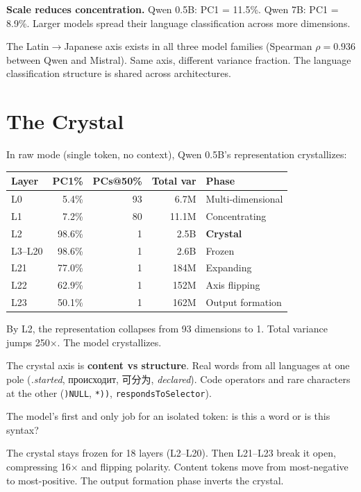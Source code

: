 \documentclass[11pt,a4paper]{report}
\begin{document}
\textbf{Scale reduces concentration.} Qwen 0.5B: PC1 = 11.5\%. Qwen 7B: PC1 = 8.9\%. Larger models spread their language classification across more dimensions.

The Latin$\to$Japanese axis exists in all three model families (Spearman $\rho = 0.936$ between Qwen and Mistral). Same axis, different variance fraction. The language classification structure is shared across architectures.

\section{The Crystal}

In raw mode (single token, no context), Qwen 0.5B's representation crystallizes:

\begin{center}
\begin{tabular}{lrrrl}
\toprule
\textbf{Layer} & \textbf{PC1\%} & \textbf{PCs@50\%} & \textbf{Total var} & \textbf{Phase} \\
\midrule
L0 & 5.4\% & 93 & 6.7M & Multi-dimensional \\
L1 & 7.2\% & 80 & 11.1M & Concentrating \\
L2 & 98.6\% & 1 & 2.5B & \textbf{Crystal} \\
L3--L20 & 98.6\% & 1 & 2.6B & Frozen \\
L21 & 77.0\% & 1 & 184M & Expanding \\
L22 & 62.9\% & 1 & 152M & Axis flipping \\
L23 & 50.1\% & 1 & 162M & Output formation \\
\bottomrule
\end{tabular}
\end{center}

By L2, the representation collapses from 93 dimensions to 1. Total variance jumps 250$\times$. The model crystallizes.

The crystal axis is \textbf{content vs structure}. Real words from all languages at one pole (\textit{.started}, происходит, 可分为, \textit{declared}). Code operators and rare characters at the other (\texttt{)NULL}, \texttt{*))}, \texttt{respondsToSelector}).

The model's first and only job for an isolated token: is this a word or is this syntax?

The crystal stays frozen for 18 layers (L2--L20). Then L21--L23 break it open, compressing 16$\times$ and flipping polarity. Content tokens move from most-negative to most-positive. The output formation phase inverts the crystal.
\end{document}
